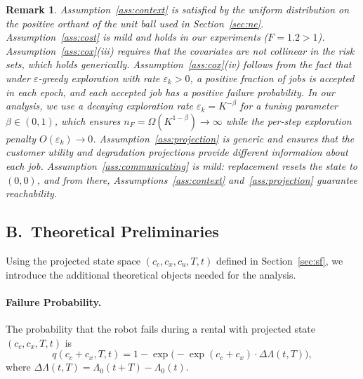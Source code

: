 \documentclass[letterpaper, 10 pt, conference]{IEEEconf}
\newtheorem{remark}{Remark}
\begin{document}
\begin{remark}
Assumption~\ref{ass:context} is satisfied by the uniform distribution on the positive orthant of the unit ball used in Section~\ref{sec:ne}. Assumption~\ref{ass:cost} is mild and holds in our experiments ($F = 1.2 > 1$). Assumption~\ref{ass:cox}(iii) requires that the covariates are not collinear in the risk sets, which holds generically. Assumption~\ref{ass:cox}(iv) follows from the fact that under $\varepsilon$-greedy exploration with rate $\varepsilon_k > 0$, a positive fraction of jobs is accepted in each epoch, and each accepted job has a positive failure probability. In our analysis, we use a decaying exploration rate $\varepsilon_k = K^{-\beta}$ for a tuning parameter $\beta \in (0,1)$, which ensures $n_F = \Omega(K^{1-\beta}) \to \infty$ while the per-step exploration penalty $O(\varepsilon_k) \to 0$. Assumption~\ref{ass:projection} is generic and ensures that the customer utility and degradation projections provide different information about each job. Assumption~\ref{ass:communicating} is mild: replacement resets the state to $(0,0)$, and from there, Assumptions~\ref{ass:context} and~\ref{ass:projection} guarantee reachability.
\end{remark}

\subsection*{B.~Theoretical Preliminaries}

Using the projected state space $(c_c, c_x, c_u, T, t)$ defined in Section~\ref{sec:sf}, we introduce the additional theoretical objects needed for the analysis.

\paragraph{Failure Probability.}
The probability that the robot fails during a rental with projected state $(c_c, c_x, T, t)$ is
\begin{equation}
    \label{eq:pfail}
    q(c_c + c_x, T, t) = 1 - \exp\!\Big(-\exp(c_c + c_x) \cdot \Delta\Lambda(t, T)\Big),
\end{equation}
where $\Delta\Lambda(t, T) = \Lambda_0(t + T) - \Lambda_0(t)$.
\end{document}

